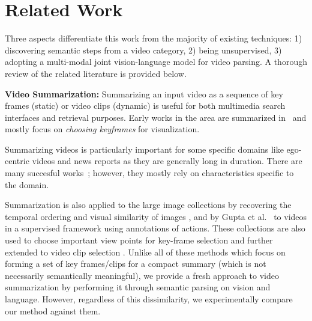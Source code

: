 
\section{Related Work}

Three aspects differentiate this work from the majority of existing techniques: 1) discovering semantic steps from a video category, 2) being unsupervised, 3) adopting a multi-modal joint vision-language model for video parsing. A thorough review of the related literature is provided below.

\noindent\textbf{Video Summarization:} Summarizing an input video as a sequence of key frames (static) or video clips (dynamic) is useful for both multimedia search interfaces and retrieval purposes. Early works in the area are summarized in~\cite{vidAbstraction} and mostly focus on \emph{choosing keyframes} for visualization.

Summarizing videos is particularly important for some specific domains like ego-centric videos and news reports as they are generally long in duration. There are many succesful works~\cite{lee2012discovering, lu2013story,rui2000automatically}; however, they mostly rely on characteristics specific to the domain.

Summarization is also applied to the large image collections by recovering the temporal ordering and visual similarity of images \cite{storyGraph}, and by Gupta et al.~\cite{gupta2009understanding} to videos in a supervised framework using annotations of actions. These collections are also used to choose important view points for key-frame selection \cite{khosla2013large} and further extended to video clip selection \cite{kim2014joint,potapov2014category}. Unlike all of these methods which  focus on forming a set of key frames/clips for a compact summary (which is not necessarily semantically meaningful), we provide a fresh approach to video summarization by performing it through semantic parsing on vision and language. However, regardless of this dissimilarity, we experimentally compare our method against them.

